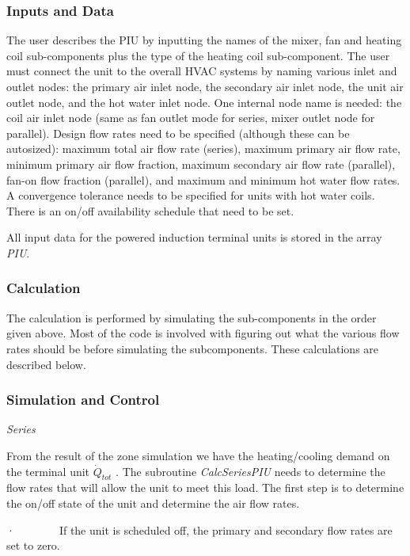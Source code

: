 \subsubsection{Inputs and Data}\label{inputs-and-data-1}

The user describes the PIU by inputting the names of the mixer, fan and heating coil sub-components plus the type of the heating coil sub-component. The user must connect the unit to the overall HVAC systems by naming various inlet and outlet nodes: the primary air inlet node, the secondary air inlet node, the unit air outlet node, and the hot water inlet node. One internal node name is needed: the coil air inlet node (same as fan outlet mode for series, mixer outlet node for parallel). Design flow rates need to be specified (although these can be autosized): maximum total air flow rate (series), maximum primary air flow rate, minimum primary air flow fraction, maximum secondary air flow rate (parallel), fan-on flow fraction (parallel), and maximum and minimum hot water flow rates. A convergence tolerance needs to be specified for units with hot water coils. There is an on/off availability schedule that need to be set.

All input data for the powered induction terminal units is stored in the array \emph{PIU}.

\subsubsection{Calculation}\label{calculation-1}

The calculation is performed by simulating the sub-components in the order given above. Most of the code is involved with figuring out what the various flow rates should be before simulating the subcomponents. These calculations are described below.

\subsubsection{Simulation and Control}\label{simulation-and-control-2}

\emph{Series}

From the result of the zone simulation we have the heating/cooling demand on the terminal unit \({\dot Q_{tot}}\) . The subroutine \emph{CalcSeriesPIU} needs to determine the flow rates that will allow the unit to meet this load. The first step is to determine the on/off state of the unit and determine the air flow rates.

·~~~~~~~~If the unit is scheduled off, the primary and secondary flow rates are set to zero.

